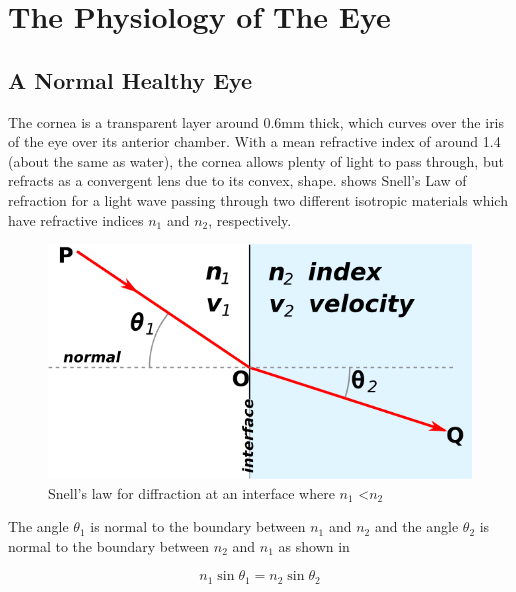 
\chapter{The Physiology of The Eye}

\label{anatomy}

\section{A Normal Healthy Eye}
\label{anatomy}

The cornea is a transparent layer around 0.6mm thick, which curves over
the iris of the eye over its anterior chamber.
\cite{yaylali1997corneal,thoft1983x,patel1994refractive}
With a mean refractive index of around 1.4 (about the same as water),
the cornea allows plenty of light to pass through, but refracts as a
convergent lens due to its convex, shape.  shows
Snell's Law of refraction for a light wave passing through two different
isotropic materials which have refractive indices $n_1$
and $n_2$, respectively.

\begin{figure}[htbp]
  \centering
    \includegraphics{figures/snells}
  \caption{Snell's law for diffraction at an interface where $n_1$ \textless $n_2$}
  \label{fig:snell}
\end{figure}

The angle $\theta_1$ is normal to the boundary between $n_1$ and $n_2$
and the angle $\theta_2$ is normal to the boundary between $n_2$ and $n_1$
as shown in 

\begin{equation}
n_1\sin\theta_1=n_2\sin\theta_2
\label{eq:refractive}
\end{equation}

